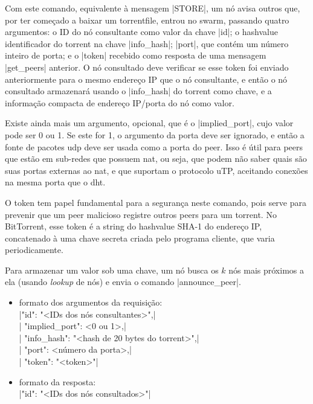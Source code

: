 

Com este comando, equivalente à mensagem \bverb|STORE|, um nó avisa outros que, por ter
começado a baixar um \gls*{torrentfile}, entrou no \gls*{swarm}, passando quatro
argumentos: o ID do nó consultante como valor da chave \bverb|id|; o \gls*{hashvalue}
identificador do \gls*{torrent} na chave \bverb|info_hash|; \bverb|port|, que contém um
número inteiro de porta; e o \bverb|token| recebido como resposta de uma mensagem
\bverb|get_peers| anterior. O nó consultado deve verificar se esse token foi enviado
anteriormente para o mesmo endereço IP que o nó consultante, e então o nó consultado
armazenará usando o \bverb|info_hash| do torrent como chave, e a informação compacta de
endereço IP/porta do nó como valor.

Existe ainda mais um argumento, opcional, que é o \bverb|implied_port|, cujo valor pode
ser 0 ou 1. Se este for 1, o argumento da porta deve ser ignorado, e então a fonte de
pacotes \gls*{udp} deve ser usada como a porta do \gls*{peer}. Isso é útil para
\glspl*{peer} que estão em sub-redes que possuem \gls{nat}, ou seja, que podem não
saber quais são suas portas externas ao \gls*{nat}, e que suportam o protocolo uTP,
aceitando conexões na mesma porta que o \gls*{dht}.

O token tem papel fundamental para a segurança neste comando, pois serve para prevenir
que um \gls*{peer} malicioso registre outros \glspl*{peer} para um \gls*{torrent}. No
BitTorrent, esse token é a \gls*{string} do \gls*{hashvalue} SHA-1 do endereço IP,
concatenado à uma chave secreta criada pelo programa cliente, que varia periodicamente.

Para armazenar um valor sob uma chave, um nó busca os $k$ nós mais próximos a ela
(usando \emph{lookup} de nós) e envia o comando \bverb|announce_peer|.

\newpage
\begin{itemize}
    \item formato dos argumentos da requisição: \\
        \sverb|{"id": "<IDs dos nós consultantes>",| \\
        \sverb| "implied_port": <0 ou 1>,| \\
        \sverb| "info_hash": "<hash de 20 bytes do torrent>",| \\
        \sverb| "port": <número da porta>,| \\
        \sverb| "token": "<token>"}|

    \item formato da resposta: \\
        \sverb|{"id": "<IDs dos nós consultados>"}|
\end{itemize}

